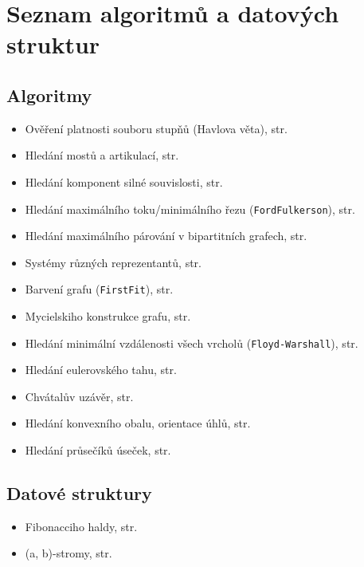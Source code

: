 \section{Seznam algoritmů a datových struktur}

\subsection{Algoritmy}

\begin{itemize}
    \item Ověření platnosti souboru stupňů (Havlova věta), str. \pageref{alg:havlova-veta}
    \item Hledání mostů a artikulací, str. \pageref{alg:hledani-mostu}
    \item Hledání komponent silné souvislosti, str. \pageref{alg:hledani-silnych-komponent}
    \item Hledání maximálního toku/minimálního řezu (\texttt{FordFulkerson}), str. \pageref{alg:ford-fulkerson}
    \item Hledání maximálního párování v bipartitních grafech, str. \pageref{alg:parovani-v-bip-grafech}
    \item Systémy různých reprezentantů, str. \pageref{alg:srr-v-bip-grafech}
    \item Barvení grafu (\texttt{FirstFit}), str. \pageref{alg:first-fit}
    \item Mycielskiho konstrukce grafu, str. \pageref{alg:mycielskian}
    \item Hledání minimální vzdálenosti všech vrcholů (\texttt{Floyd-Warshall}), str. \pageref{alg:floyd-warshall}
    \item Hledání eulerovského tahu, str. \pageref{alg:euleruv-tah}
    \item Chvátalův uzávěr, str. \pageref{alg:chvataluv-uzaver}
    \item Hledání konvexního obalu, orientace úhlů, str. \pageref{alg:konvexni-obal}
    \item Hledání průsečíků úseček, str. \pageref{alg:pruseciky-usecek}
\end{itemize}

\subsection{Datové struktury}

\begin{itemize}
    \item Fibonacciho haldy, str. \pageref{data:fibonacciho-haldy}
    \item (a, b)-stromy, str. \pageref{data:ab-stromy}
\end{itemize}

